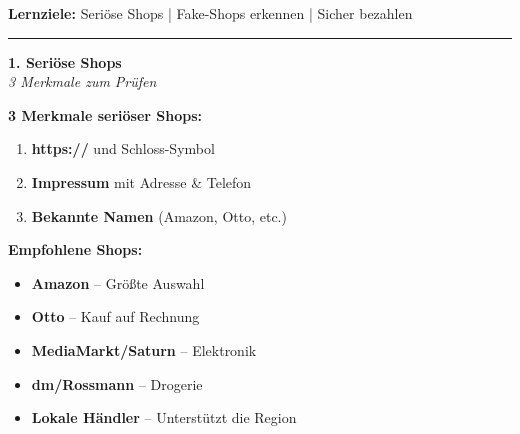 \documentclass[a4paper,landscape,8pt]{extarticle}
\begin{document}

 \hfill
{\footnotesize\textbf{Lernziele:} Seriöse Shops | Fake-Shops erkennen | Sicher bezahlen}

\vspace{1mm}
\hrule
\vspace{1mm}

\begin{minipage}[t]{0.32\linewidth}
\begin{center}
\colorbox{shopgreen!15}{%
\begin{minipage}{0.95\linewidth}
\vspace{2mm}
\begin{center}
{\Large\bfseries\textcolor{shopgreen}{1. Seriöse Shops}}\\[1pt]
{\footnotesize\itshape 3 Merkmale zum Prüfen}
\end{center}
\vspace{2mm}
\end{minipage}%
}
\end{center}

\vspace{1mm}

\textbf{3 Merkmale seriöser Shops:}
\begin{enumerate}
\item \textbf{https://} und Schloss-Symbol
\item \textbf{Impressum} mit Adresse \& Telefon
\item \textbf{Bekannte Namen} (Amazon, Otto, etc.)
\end{enumerate}

\textbf{Empfohlene Shops:}
\begin{itemize}
\item \textbf{Amazon} -- Größte Auswahl
\item \textbf{Otto} -- Kauf auf Rechnung
\item \textbf{MediaMarkt/Saturn} -- Elektronik
\item \textbf{dm/Rossmann} -- Drogerie
\item \textbf{Lokale Händler} -- Unterstützt die Region
\end{itemize}

\vspace{2mm}

\end{minipage}%
\end{document}
